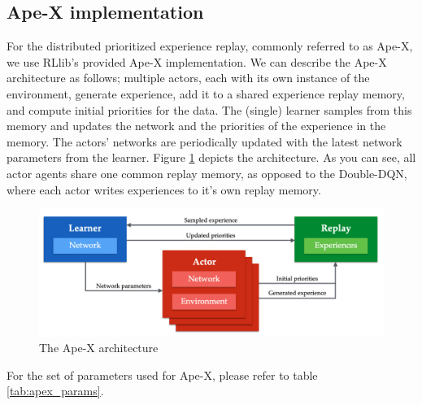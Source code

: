 \documentclass[12pt,a4paper]{article}
\begin{document}
\subsection{Ape-X implementation}
For the distributed prioritized experience replay, commonly referred to as Ape-X, we use RLlib's provided Ape-X implementation.
We can describe the Ape-X architecture as follows; multiple actors, each with its own instance of the environment,
generate experience, add it to a shared experience replay memory, and compute initial priorities for the data.
The (single) learner samples from this memory and updates the network and the priorities of the experience in
the memory. The actors’ networks are periodically updated with the latest network parameters from the learner. Figure \ref{fig:apexnutshell} depicts the architecture. As you can see, all actor agents share one common replay memory, as opposed to the Double-DQN, where each actor writes experiences to it's own replay memory.
\begin{figure}
    \centering
    \includegraphics[width=\linewidth]{Figures/apexnutshell.png}
    \caption{The Ape-X architecture \cite{DBLP:journals/corr/abs-1803-00933}}
    \label{fig:apexnutshell}
\end{figure}
For the set of parameters used for Ape-X, please refer to table \ref{tab:apex_params}.
\end{document}
